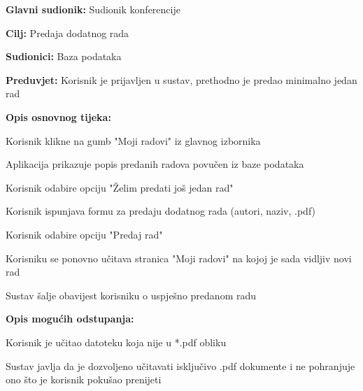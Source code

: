 					\begin{packed_item}
						
						\item \textbf{Glavni sudionik: } Sudionik konferencije
						\item  \textbf{Cilj:} Predaja dodatnog rada
						\item  \textbf{Sudionici:} Baza podataka
						\item  \textbf{Preduvjet:} Korisnik je prijavljen u sustav, prethodno je predao minimalno jedan rad
						\item  \textbf{Opis osnovnog tijeka:}
						                                                                          
						\item[] \begin{packed_enum}
							\item Korisnik klikne na gumb "Moji radovi" iz glavnog izbornika
							\item Aplikacija prikazuje popis predanih radova povučen iz baze podataka
							\item Korisnik odabire opciju "Želim predati još jedan rad"
							\item Korisnik ispunjava formu za predaju dodatnog rada (autori, naziv, .pdf)
							\item Korisnik odabire opciju "Predaj rad"
							\item Korisniku se ponovno učitava stranica "Moji radovi" na kojoj je sada vidljiv novi rad
							\item Sustav šalje obavijest korisniku o uspješno predanom radu 
							
							
						\end{packed_enum}
						
						\item  \textbf{Opis mogućih odstupanja:}
						        
						\item[] \begin{packed_item}
							
							\item[4.a]  Korisnik je učitao datoteku koja nije u *.pdf obliku
							\item[] \begin{packed_enum}
								
								\item Sustav javlja da je dozvoljeno učitavati isključivo .pdf dokumente i ne pohranjuje ono što je korisnik pokušao prenijeti
								      

\end{packed_enum}
\end{packed_item}
\end{packed_item}
